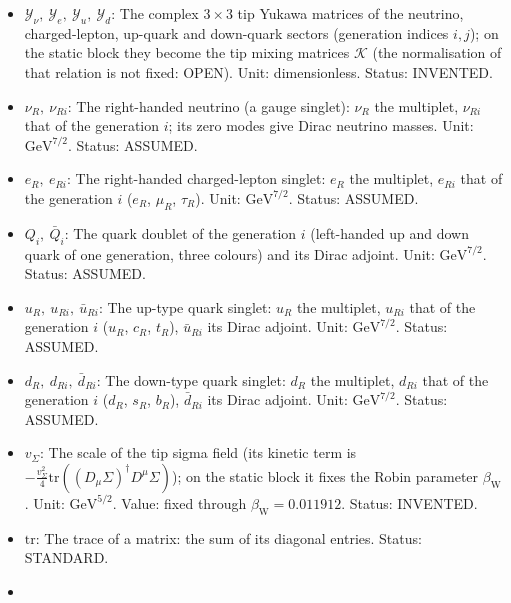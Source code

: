 \documentclass[
  10pt,
]{article}
\begin{document}
\begin{itemize}
  on the tip (\(\Sigma^\dagger\Sigma = \mathbf{1}\)) that replaces the
  Higgs doublet; its three modes are the longitudinal \(W^+\), \(W^-\)
  and \(Z\), and \(\Sigma = \mathbf{1}\) is the unitary gauge. Unit:
  dimensionless. Status: INVENTED.
\item
  \(\mathcal{Y}_\nu,\ \mathcal{Y}_e,\ \mathcal{Y}_u,\ \mathcal{Y}_d\):
  The complex \(3 \times 3\) tip Yukawa matrices of the neutrino,
  charged-lepton, up-quark and down-quark sectors (generation indices
  \(i, j\)); on the static block they become the tip mixing matrices
  \(\mathcal{K}\) (the normalisation of that relation is not fixed:
  OPEN). Unit: dimensionless. Status: INVENTED.
\item
  \(\nu_R,\ \nu_{Ri}\): The right-handed neutrino (a gauge singlet):
  \(\nu_R\) the multiplet, \(\nu_{Ri}\) that of the generation \(i\);
  its zero modes give Dirac neutrino masses. Unit:
  \(\mathrm{GeV}^{7/2}\). Status: ASSUMED.
\item
  \(e_R,\ e_{Ri}\): The right-handed charged-lepton singlet: \(e_R\) the
  multiplet, \(e_{Ri}\) that of the generation \(i\) (\(e_R\),
  \(\mu_R\), \(\tau_R\)). Unit: \(\mathrm{GeV}^{7/2}\). Status: ASSUMED.
\item
  \(Q_i,\ \bar Q_i\): The quark doublet of the generation \(i\)
  (left-handed up and down quark of one generation, three colours) and
  its Dirac adjoint. Unit: \(\mathrm{GeV}^{7/2}\). Status: ASSUMED.
\item
  \(u_R,\ u_{Ri},\ \bar u_{Ri}\): The up-type quark singlet: \(u_R\) the
  multiplet, \(u_{Ri}\) that of the generation \(i\) (\(u_R\), \(c_R\),
  \(t_R\)), \(\bar u_{Ri}\) its Dirac adjoint. Unit:
  \(\mathrm{GeV}^{7/2}\). Status: ASSUMED.
\item
  \(d_R,\ d_{Ri},\ \bar d_{Ri}\): The down-type quark singlet: \(d_R\)
  the multiplet, \(d_{Ri}\) that of the generation \(i\) (\(d_R\),
  \(s_R\), \(b_R\)), \(\bar d_{Ri}\) its Dirac adjoint. Unit:
  \(\mathrm{GeV}^{7/2}\). Status: ASSUMED.
\item
  \(v_\Sigma\): The scale of the tip sigma field (its kinetic term is
  \(-\frac{v_\Sigma^2}{4}\mathrm{tr}((D_\mu\Sigma)^\dagger D^\mu\Sigma)\));
  on the static block it fixes the Robin parameter
  \(\beta_{\mathrm{W}}\). Unit: \(\mathrm{GeV}^{5/2}\). Value: fixed
  through \(\beta_{\mathrm{W}} = 0.011912\). Status: INVENTED.
\item
  \(\mathrm{tr}\): The trace of a matrix: the sum of its diagonal
  entries. Status: STANDARD.
\item

\end{itemize}
\end{document}
